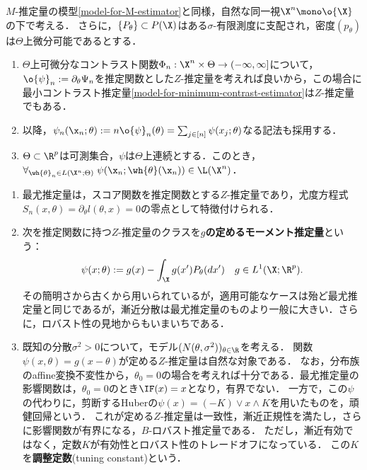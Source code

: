 \documentclass[uplatex,dvipdfmx]{jsreport}
\begin{document}
\begin{model}[可微分モデル]\label{model-differentiable}
    $M$-推定量の模型\ref{model-for-M-estimator}と同様，自然な同一視$\X^n\mono\o{\X}$の下で考える．
    さらに，$\{P_\theta\}\subset P(\X)$はある$\sigma$-有限測度に支配され，密度$(p_\theta)$は$\Theta$上微分可能であるとする．
    \begin{enumerate}
        \item $\Theta$上可微分なコントラスト関数$\Phi_n:\X^n\times\Theta\to(-\infty,\infty]$について，$\o{\psi}_n:=\partial_\theta\Psi_n$を推定関数とした$Z$-推定量を考えれば良いから，この場合に最小コントラスト推定量\ref{model-for-minimum-contrast-estimator}は$Z$-推定量でもある．
        \item 以降，$\psi_n(\x_n;\theta):=n\o{\psi}_n(\theta)=\sum_{j\in[n]}\psi(x_j;\theta)$なる記法も採用する．
        \item $\Theta\subset\R^p$は可測集合，$\psi$は$\Theta$上連続とする．このとき，$\forall_{\wh{\theta}_n\in L(\X^n;\Theta)}\;\psi(\x_n;\wh{\theta}(\x_n))\in\L(\X^n)$．
    \end{enumerate}
\end{model}

\begin{example}\mbox{}
    \begin{enumerate}
        \item 最尤推定量は，スコア関数を推定関数とする$Z$-推定量であり，尤度方程式$S_n(x,\theta)=\partial_\theta l(\theta,x)=0$の零点として特徴付けられる．
        \item 次を推定関数に持つ$Z$-推定量のクラスを\textbf{$g$の定めるモーメント推定量}という：
        \[\psi(x;\theta):=g(x)-\int_\X g(x')P_\theta(dx')\quad g\in L^1(\X;\R^p).\]
        その簡明さから古くから用いられているが，適用可能なケースは殆ど最尤推定量と同じであるが，漸近分散は最尤推定量のものより一般に大きい．さらに，ロバスト性の見地からもいまいちである．
        \item 既知の分散$\sigma^2>0$について，モデル$(N(\theta,\sigma^2))_{\theta\in\R}$を考える．
        関数$\psi(x,\theta)=g(x-\theta)$が定める$Z$-推定量は自然な対象である．
        なお，分布族のaffine変換不変性から，$\theta_0=0$の場合を考えれば十分である．最尤推定量の影響関数は，$\theta_0=0$のとき$\IF(x)=x$となり，有界でない．
        一方で，この$\psi$の代わりに，剪断するHuberの$\psi(x)=(-K)\lor x\land K$を用いたものを，頑健回帰という．
        これが定める$Z$-推定量は一致性，漸近正規性を満たし，さらに影響関数が有界になる，$B$-ロバスト推定量である．
        ただし，漸近有効ではなく，定数$K$が有効性とロバスト性のトレードオフになっている．
        この$K$を\textbf{調整定数}(tuning constant)という．
    \end{enumerate}
\end{example}
\end{document}
